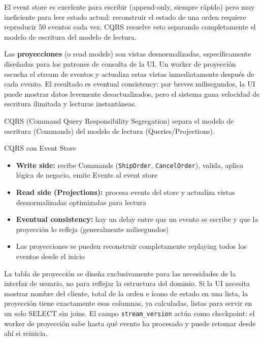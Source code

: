 El event store es excelente para escribir (append-only, siempre rápido) pero muy ineficiente para leer estado actual: reconstruir el estado de una orden requiere reproducir 50 eventos cada vez.
CQRS resuelve esto separando completamente el modelo de escritura del modelo de lectura.

Las \textbf{proyecciones} (o read models) son vistas desnormalizadas, específicamente diseñadas para los patrones de consulta de la UI.
Un worker de proyección escucha el stream de eventos y actualiza estas vistas inmediatamente después de cada evento.
El resultado es eventual consistency: por breves milisegundos, la UI puede mostrar datos levemente desactualizados, pero el sistema gana velocidad de escritura ilimitada y lecturas instantáneas.

CQRS (Command Query Responsibility Segregation) separa el modelo de escritura (Commands) del modelo de lectura (Queries/Projections).

\begin{teoriabox}{CQRS con Event Store}
\begin{itemize}
  \item \textbf{Write side:} recibe Commands (\texttt{ShipOrder}, \texttt{CancelOrder}), valida, aplica lógica de negocio, emite Events al event store
  \item \textbf{Read side (Projections):} procesa events del store y actualiza vistas desnormalizadas optimizadas para lectura
  \item \textbf{Eventual consistency:} hay un delay entre que un evento se escribe y que la proyección lo refleja (generalmente milisegundos)
  \item Las proyecciones se pueden reconstruir completamente replaying todos los eventos desde el inicio
\end{itemize}
\end{teoriabox}

La tabla de proyección se diseña exclusivamente para las necesidades de la interfaz de usuario, no para reflejar la estructura del dominio.
Si la UI necesita mostrar nombre del cliente, total de la orden e ícono de estado en una lista, la proyección tiene exactamente esas columnas, ya calculadas, listas para servir en un solo SELECT sin joins.
El campo \texttt{stream\_version} actúa como checkpoint: el worker de proyección sabe hasta qué evento ha procesado y puede retomar desde ahí si reinicia.

